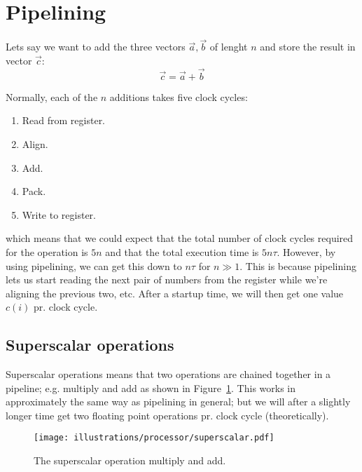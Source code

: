 
\section{Pipelining} %
\label{sec:pipelining}


Lets say we want to add the three vectors $\vec{a}, \vec{b}$ of lenght $n$ and store the result in vector $\vec{c}$:
\begin{equation}
  \vec{c} = \vec{a} + \vec{b}
\end{equation}

Normally, each of the $n$ additions takes five clock cycles:
\begin{enumerate}
  \item Read from register.
  \item Align.
  \item Add.
  \item Pack.
  \item Write to register.
\end{enumerate}
which means that we could expect that the total number of clock cycles required for the operation is $5n$ and that the total execution time is $5n\tau$. However, by using pipelining, we can get this down to $n\tau$ for $n\gg 1$. This is because pipelining lets us start reading the next pair of numbers from the register while we're aligning the previous two, etc. After a startup time, we will then get one value $c(i)$ pr. clock cycle.

\subsection{Superscalar operations} %
\label{sub:superscalar_operations}
Superscalar operations means that two operations are chained together in a pipeline; e.g. multiply and add as shown in Figure~\ref{fig:superscalar}. This works in approximately the same way as pipelining in general; but we will after a slightly longer time get two floating point operations pr. clock cycle (theoretically).


\begin{figure}[htbp]
  \centering
  \texttt{[image: illustrations/processor/superscalar.pdf]}
  \caption{The superscalar operation multiply and add.}
  \label{fig:superscalar}
\end{figure}

